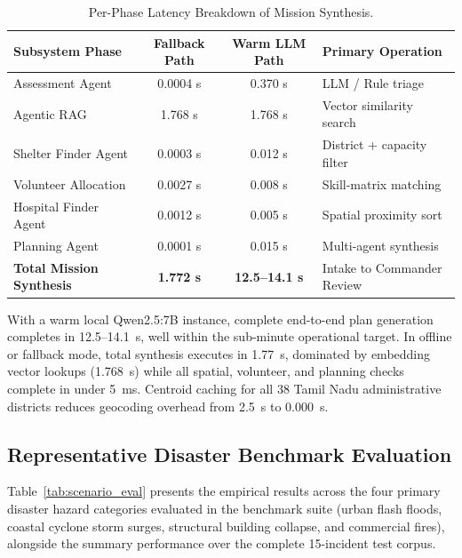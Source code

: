 \documentclass[conference]{IEEEtran}
\begin{document}
\begin{table}[htbp]
\caption{Per-Phase Latency Breakdown of Mission Synthesis.}
\label{tab:latency_eval}
\centering
\begin{tabular}{|l|c|c|p{2.6cm}|}
\hline
\textbf{Subsystem Phase} & \textbf{Fallback Path} & \textbf{Warm LLM Path} & \textbf{Primary Operation} \\
\hline
Assessment Agent & 0.0004 s & 0.370 s & LLM / Rule triage \\
\hline
Agentic RAG & 1.768 s & 1.768 s & Vector similarity search \\
\hline
Shelter Finder Agent & 0.0003 s & 0.012 s & District + capacity filter \\
\hline
Volunteer Allocation & 0.0027 s & 0.008 s & Skill-matrix matching \\
\hline
Hospital Finder Agent & 0.0012 s & 0.005 s & Spatial proximity sort \\
\hline
Planning Agent & 0.0001 s & 0.015 s & Multi-agent synthesis \\
\hline
\textbf{Total Mission Synthesis} & \textbf{1.772 s} & \textbf{12.5--14.1 s} & Intake to Commander Review \\
\hline
\end{tabular}
\end{table}

With a warm local Qwen2.5:7B instance, complete end-to-end plan generation completes in 12.5--14.1~s, well within the sub-minute operational target. In offline or fallback mode, total synthesis executes in 1.77~s, dominated by embedding vector lookups (1.768~s) while all spatial, volunteer, and planning checks complete in under 5~ms. Centroid caching for all 38 Tamil Nadu administrative districts reduces geocoding overhead from 2.5~s to 0.000~s.

\subsection{Representative Disaster Benchmark Evaluation}
Table~\ref{tab:scenario_eval} presents the empirical results across the four primary disaster hazard categories evaluated in the benchmark suite (urban flash floods, coastal cyclone storm surges, structural building collapse, and commercial fires), alongside the summary performance over the complete 15-incident test corpus.
\end{document}
